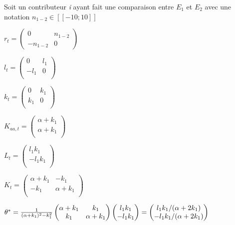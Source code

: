 \begin{exemple}\label{example:n1}



Soit un contributeur \textit{i} ayant fait une comparaison entre $E_{1}$ et $E_{2}$ avec une notation $n_{1-2} \in [\![-10;10]\!]$

$r_{t}= \begin{pmatrix}
0 & n_{1-2} \\
-n_{1-2} & 0 
\end{pmatrix}$

$l_{t}= \begin{pmatrix}
0 & l_1 \\
-l_1 & 0 \\
\end{pmatrix}
$

$k_{t}= \begin{pmatrix}
0 & k_1 \\
k_1 & 0 \\
\end{pmatrix}
$

$K_{aa,t}= \begin{pmatrix}
\alpha + k_1\\
\alpha +  k_1\\
\end{pmatrix} 
$

$L_{t}= \begin{pmatrix}
l_1 k_1\\
-l_1 k_1 \\
\end{pmatrix} 
$

$K_{t}= \begin{pmatrix}
\alpha + k_1 & -k_1 \\
-k_1 & \alpha + k_1 \\
\end{pmatrix}
$

$\theta^*= \frac{1}{(\alpha + k_1)^2-k_1^2} \begin{pmatrix}
\alpha + k_1 & k_1 \\
k_1 & \alpha + k_1 \\
\end{pmatrix}\begin{pmatrix}
l_1 k_1\\
-l_1 k_1 \\
\end{pmatrix} 
= 
\begin{pmatrix}
l_1k_1 / (\alpha + 2k_1)\\
-l_1k_1 / (\alpha + 2k_1)\\
\end{pmatrix} 
$
\end{exemple}
